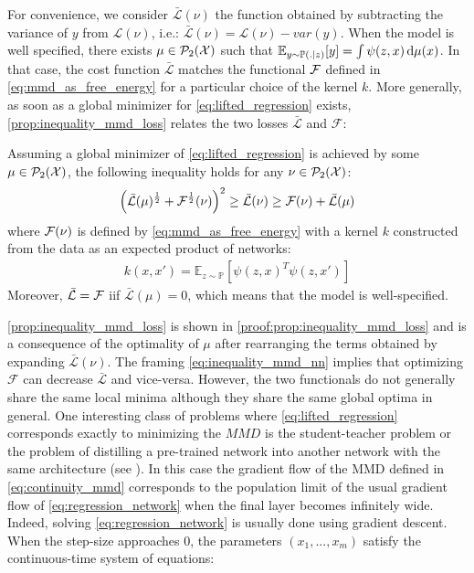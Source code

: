 For convenience, we consider $\bar{\mathcal{L}}(\nu)$ the function obtained by subtracting the variance of $y$ from $\mathcal{L}(\nu)$, i.e.: $\bar{\mathcal{L}}(\nu) = \mathcal{L}(\nu) - var(y) $. When the model is well specified, there exists $\mu \in \mathcal{P}_2({{\mathcal X}}) $ such that $\mathbb{E}_{y\sim \mathbb{P}(.|z)}[y] =  \int \psi(z,x) \mathop{}\!\mathrm{d} \mu(x)$. In that case, the cost function $\bar{\mathcal{L}}$ matches  the functional ${{\mathcal F}}$ defined in \cref{eq:mmd_as_free_energy}  for a particular choice of the kernel $k$. More generally, as soon as a global minimizer for  \cref{eq:lifted_regression} exists,  \cref{prop:inequality_mmd_loss} relates the two losses $\bar{\mathcal{L}}$ and $\mathcal{F}$:
\begin{proposition}\label{prop:inequality_mmd_loss}
	Assuming a global minimizer of \cref{eq:lifted_regression} is achieved by some $\mu\in \mathcal{P}_2({{\mathcal X}})$, the following inequality holds for any $\nu \in \mathcal{P}_2({{\mathcal X}})$:
	\begin{align}\label{eq:inequality_mmd_nn}
		\left(\bar{\mathcal{L}}(\mu)^{\frac{1}{2}} + {{\mathcal F}}^{\frac{1}{2}}(\nu)\right)^2
		\geq 
		\bar{\mathcal{L}}(\nu)
		\geq
		\mathcal{F}(\nu) + \bar{\mathcal{L}}(\mu)
	\end{align}
	where ${{\mathcal F}}(\nu)$ is defined by \cref{eq:mmd_as_free_energy} with  a kernel $k$  constructed from the data as an expected product of networks:
\begin{align}
	k(x,x') = \mathbb{E}_{z\sim \mathbb{P}} [\psi(z,x)^T\psi(z,x')]
\end{align}
Moreover, $\bar{\mathcal{L}} = {{\mathcal F}}$ iif $\bar{\mathcal{L}}(\mu)=0$, which means that the model is well-specified. 
\end{proposition}
\cref{prop:inequality_mmd_loss} is shown in \cref{proof:prop:inequality_mmd_loss} and is a consequence of the optimality of $\mu$ after rearranging the terms obtained by expanding $\bar{\mathcal{L}}(\nu)$.
The framing \cref{eq:inequality_mmd_nn} implies that optimizing $\mathcal{F}$ can decrease  $\bar{\mathcal{L}}$ and vice-versa. However, the two functionals do not generally share the same local minima although they share the same global optima in general. One interesting class of problems where \cref{eq:lifted_regression} corresponds exactly to minimizing the $MMD$ is the student-teacher problem or the problem of distilling a pre-trained network into another network with the same architecture (see \cite{rotskoff2019global}). In this case the gradient flow of the MMD defined in \cref{eq:continuity_mmd} corresponds to the population limit of the usual gradient flow of \cref{eq:regression_network} when the final layer becomes infinitely wide. Indeed, solving \cref{eq:regression_network} is usually done using gradient descent. When the step-size approaches $0$, the parameters $(x_1,...,x_m)$ satisfy the continuous-time system of equations:
